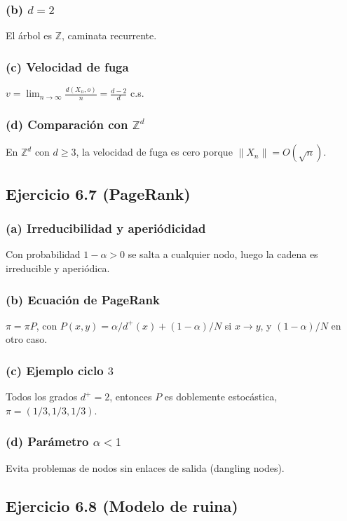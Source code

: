 \documentclass[letterpaper, 12pt]{article}
\newcommand{\Z}{\mathbb{Z}}
\newcommand{\1}{\mathbbm{1}}
\begin{document}
    \subsubsection*{(b) $d=2$}
    El \'arbol es $\Z$, caminata recurrente.

    \subsubsection*{(c) Velocidad de fuga}
    $v=\lim_{n\to\infty}\frac{d(X_n,o)}{n}=\frac{d-2}{d}$ c.s.

    \subsubsection*{(d) Comparaci\'on con $\Z^d$}
    En $\Z^d$ con $d\ge3$, la velocidad de fuga es cero porque $\|X_n\|=O(\sqrt{n})$.

    \subsection{Ejercicio 6.7 (PageRank)}

    \subsubsection*{(a) Irreducibilidad y aperi\'odicidad}
    Con probabilidad $1-\alpha>0$ se salta a cualquier nodo, luego la cadena es irreducible y aperi\'odica.

    \subsubsection*{(b) Ecuaci\'on de PageRank}
    $\pi=\pi P$, con $P(x,y)=\alpha/d^+(x)+(1-\alpha)/N$ si $x\to y$, y $(1-\alpha)/N$ en otro caso.

    \subsubsection*{(c) Ejemplo ciclo $3$}
    Todos los grados $d^+=2$, entonces $P$ es doblemente estoc\'astica, $\pi=(1/3,1/3,1/3)$.

    \subsubsection*{(d) Par\'ametro $\alpha<1$}
    Evita problemas de nodos sin enlaces de salida (dangling nodes).

    \subsection{Ejercicio 6.8 (Modelo de ruina)}
\end{document}
